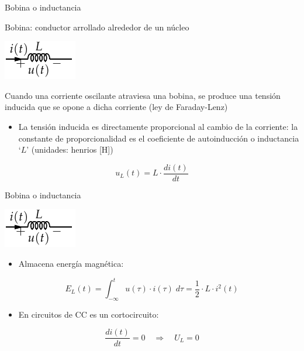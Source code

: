 \documentclass[aspectratio=169, xcolor={usenames,svgnames,dvipsnames}]{beamer}
\begin{document}
\begin{frame}{Bobina o inductancia}

    \vspace{3mm}
    \alert{Bobina:} conductor arrollado alrededor de un núcleo
    \begin{center}
    \includegraphics[height=0.2\textheight]{../figs/Bobina.pdf}
    \end{center}

    Cuando una corriente oscilante atraviesa una bobina, se produce una \alert{tensión inducida que se opone a dicha corriente} (ley de Faraday-Lenz)

    \begin{itemize}
        \item La tensión inducida es directamente \alert{proporcional al cambio de la corriente}: la constante de proporcionalidad es el coeficiente de autoinducción o \alert{inductancia} `$L$' (unidades: henrios [H])
    \end{itemize}
    \[
        \boxed{ u_L(t)=L\cdot\frac{di(t)}{dt} } %
    \]
    
\end{frame}


\begin{frame}{Bobina o inductancia}
    \begin{center}
    \includegraphics[height=0.2\textheight]{../figs/Bobina.pdf}
    \end{center}
    
    \begin{itemize}
    \item Almacena \alert{energía magnética}:
    \end{itemize}
    \[
      E_L(t) = \int_{-\infty}^t u(\tau) \cdot i(\tau) \; d\tau = \frac{1}{2} \cdot L \cdot i^2(t)
    \]
    \begin{itemize}
    \item En circuitos de CC es un \alert{cortocircuito}:
    \end{itemize}
    \begin{equation*}
      \frac{di(t)}{dt} = 0 \quad \Rightarrow \quad U_L = 0
    \end{equation*}
\end{frame}
\end{document}
